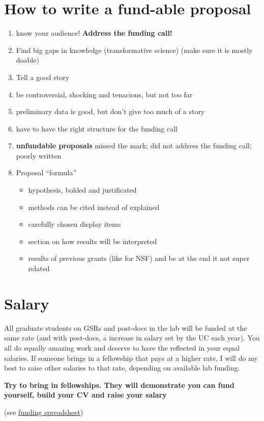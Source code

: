 \documentclass[12pt]{article}
\begin{document}
\section{How to write a fund-able proposal}

\begin{enumerate}
\item know your audience! \textbf{Address the funding call!}
\item Find big gaps in knowledge (transformative science) (make sure
  it is mostly doable)
\item Tell a good story
\item be controversial, shocking and tenacious, but not too far
\item preliminary data is good, but don't give too much of a story
\item have to have the right structure for the funding call
\item \textbf{unfundable proposals} missed the mark; did not address
  the funding call; poorly written
\item Proposal ``formula''
  \begin{itemize}
  \item hypothesis, bolded and justificated
  \item methods can be cited instead of explained
  \item carefully chosen display items
  \item section on how results will be interpreted
  \item results of previous grants (like for NSF) and be at the end it
    not super related
  \end{itemize}
\end{enumerate}

\section{Salary}
All graduate students on GSRs and post-docs in the lab will be funded
at the same rate (and with post-docs, a increase in salary set by the
UC each year). You all do equally amazing work and deserve to have the
reflected in your equal salaries. If someone brings in a fellowship
that pays at a higher rate, I will do my best to raise other salaries
to that rate, depending on available lab funding.

\textbf{Try to bring in fellowships. They will demonstrate you can
  fund yourself, build your CV and raise your salary}

(see \href{https://docs.google.com/spreadsheets/d/1X2Dyz4HW13hsTmNoUvSoMYOmyobVVtfoGtEtdS0LQtI/edit?usp=sharing}{funding
  spreadsheet})
\end{document}
